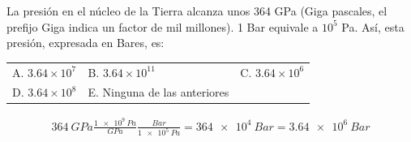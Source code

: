 \documentclass[12pt, a4paper]{article}
\begin{document}
\begin{exercise}[ID=presion, subtitle={Presión en el núcleo de la Tierra}, tags={banco}]
La presión en el núcleo de la Tierra alcanza unos 364 GPa (Giga pascales, el prefijo Giga indica un factor de mil millones). 1 Bar equivale a $10^5$ Pa. Así, esta presión, expresada en Bares, es:
    
    \begin{tabular}{@{}lll@{}}
        A. $3.64 \times 10^7$ & B. $3.64 \times 10^{11}$ & C. $3.64 \times 10^6$ \\
        D. $3.64 \times 10^8$ & E. Ninguna de las anteriores \\
    \end{tabular}
\end{exercise}
\begin{solution}
\begin{align}
        \qty{364}{GPa}\frac{\qty{1e9}{Pa}}{\unit{GPa}}\frac{\unit{Bar}}{\qty{1e5}{Pa}}=
        \qty{364e4}{Bar} = \qty{3.64e6}{Bar}
    \end{align}
\end{solution}
\end{document}
